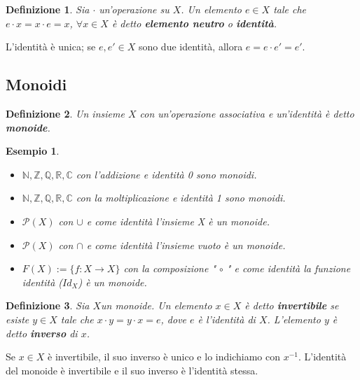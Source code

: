 \documentclass[a4paper,12pt]{article}
\theoremstyle{mystyle}
\newtheorem*{definition}{Definizione}
\newtheorem*{example}{Esempio}
\begin{document}
\begin{definition}
    Sia \(\cdot\) un'operazione su \(X\). Un elemento \(e \in X\) tale che \(e \cdot x = x \cdot e = x\), \(\forall x \in X\) è detto \textbf{elemento neutro }o \textbf{identità}.
\end{definition}

L'identità è unica; se \(e,e' \in X\) sono due identità, allora \(e = e \cdot e' = e'\).

\subsection{Monoidi}

\begin{definition}
    Un insieme \(X\) con un'operazione associativa e un'identità è detto \newline \textbf{monoide}.
\end{definition}

\begin{example}
    \
    \begin{itemize}
        \item \(\mathbb{N,Z,Q,R,C}\) con l'addizione e identità 0 sono monoidi.
        \item \(\mathbb{N,Z,Q,R,C}\) con la moltiplicazione e identità 1 sono monoidi.
        \item \(\mathcal{P} (X)\) con \(\cup\)  e come identità l'insieme X è un monoide.
        \item \(\mathcal{P} (X)\) con \(\cap\)  e come identità l'insieme vuoto è un monoide.
        \item \(F(X):= \{f: X \rightarrow X\}\) con la composizione " \(\circ\) " e come identità la funzione identità (\(Id_X\)) è un monoide.
    \end{itemize}
\end{example}

\begin{definition}
    Sia \(X \)un monoide. Un elemento \(x \in X\) è detto \textbf{invertibile} se esiste \(y \in X\) tale che \(x \cdot y = y \cdot x = e\), dove \(e\) è l'identità di \(X\). L'elemento \(y\) è detto \textbf{inverso} di \(x\).
\end{definition}

Se \(x \in X\) è invertibile, il suo inverso è unico e lo indichiamo con \(x^{-1}\).\newline
L'identità del monoide è invertibile e il suo inverso è l'identità stessa.
\end{document}
